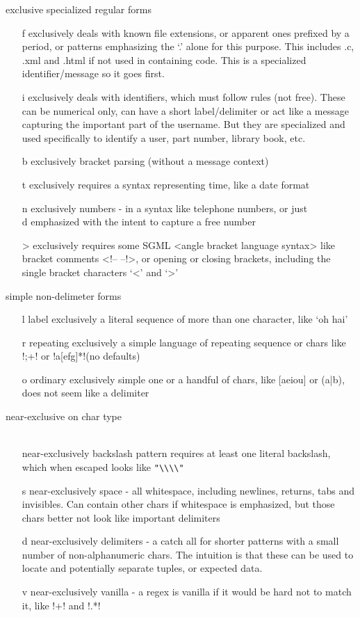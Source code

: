 exclusive specialized regular forms
\begin{itemize}
\item[ f ] exclusively deals with known file extensions, or apparent ones prefixed by a period, or patterns emphasizing the `.'  alone for this purpose.  This includes .c, .xml and .html if not used in containing code.  This is a specialized identifier/message so it goes first.
\item[ i ] exclusively deals with identifiers, which must follow rules (not free).  These can be numerical only, can have a short label/delimiter or act like a message capturing the important part of the username.  But they are specialized and used specifically to identify a user, part number, library book, etc.
\item[ b ] exclusively bracket parsing (without a message context)
\item[ t ] exclusively requires a syntax representing time, like a date format
\item[ n ] exclusively numbers - in a syntax like telephone numbers, or just \\d emphasized with the intent to capture a free number
\item[ > ] exclusively requires some SGML <angle bracket language syntax> like bracket comments <!-- --!>, or opening or closing brackets, including the single bracket characters `<' and `>'
\end{itemize}

simple non-delimeter forms
\begin{itemize}
\item[ l ] label  exclusively  a literal sequence of more than one character, like `oh hai'
\item[ r ] repeating  exclusively a simple language of repeating sequence or chars like \cverb!;+! or \cverb!a[efg]*!(no defaults)
\item[ o ] ordinary   exclusively simple one or a handful of chars, like [aeiou] or (a|b), does not seem like a delimiter
\end{itemize}

near-exclusive on char type
\begin{itemize}
\item[ \\ ] near-exclusively  backslash  pattern requires at least one literal backslash, which when escaped looks like \verb!"\\\\"!
\item[ s ] near-exclusively space - all whitespace, including newlines, returns, tabs and invisibles.  Can contain other chars if whitespace is emphasized, but those chars better not look like important delimiters
\item[ d ] near-exclusively delimiters - a catch all for shorter patterns with a small number of non-alphanumeric chars.  The intuition is that these can be used to locate and potentially separate tuples, or expected data.
\item[ v ] near-exclusively vanilla - a regex is vanilla if it would be hard not to match it, like \cverb!\w+! and \cverb!.*!
\end{itemize}

